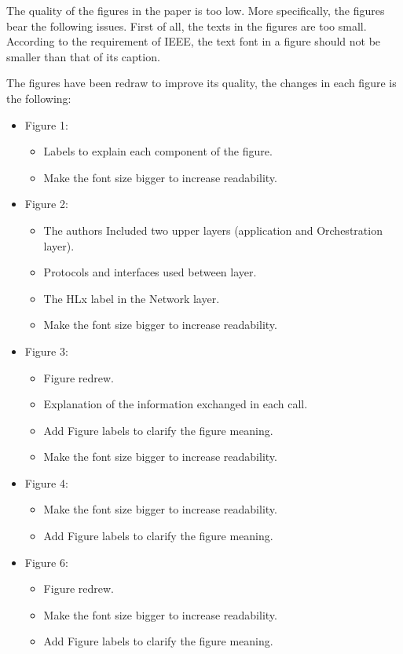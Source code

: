\documentclass[12pt]{journalrebuttal}
\begin{document}
\begin{revcomment}
The quality of the figures in the paper is too low. More specifically, the figures bear the following issues. First of all, the texts in the figures are too small. According to the requirement of IEEE, the text font in a figure should not be smaller than that of its caption.
\end{revcomment}

\begin{response}
The figures have been redraw to improve its quality, the changes in each figure is the following:
\begin{itemize}
    \item Figure 1: 
    \begin{itemize}
        \item Labels to explain each component of the figure.
        \item Make the font size bigger to increase readability.
    \end{itemize}
    \item Figure 2:
    \begin{itemize}
        \item The authors Included two upper layers (application and Orchestration layer). 
        \item Protocols and interfaces used between layer.
        \item The HLx label in the Network layer.
        \item Make the font size bigger to increase readability.
    \end{itemize}
    \item Figure 3:
    \begin{itemize}
        \item Figure redrew.
        \item Explanation of the information exchanged in each call.
        \item Add Figure labels to clarify the figure meaning.
        \item Make the font size bigger to increase readability.
    \end{itemize}
    \item Figure 4:
      \begin{itemize}
        \item Make the font size bigger to increase readability.
         \item Add Figure labels to clarify the figure meaning.
    \end{itemize}
    \item Figure 6:
    \begin{itemize}
        \item Figure redrew.
        \item Make the font size bigger to increase readability.
        \item Add Figure labels to clarify the figure meaning.
    \end{itemize}
\end{itemize}
\end{response}
\end{document}
